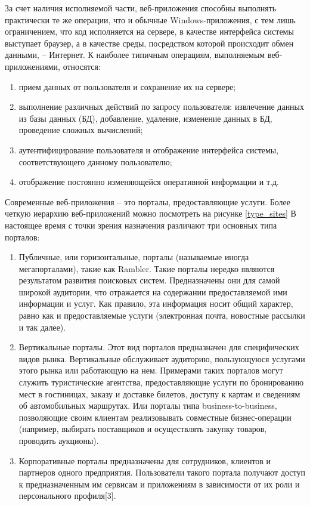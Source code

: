 За счет наличия исполняемой части, веб-приложения способны выполнять практически те же операции, что и обычные Windows-приложения, с тем лишь ограничением, что код исполняется на сервере, в качестве интерфейса системы выступает браузер, а в качестве среды, посредством которой происходит обмен данными, -- Интернет. К наиболее типичным операциям, выполняемым веб-приложениями, относятся:
\begin{enumerate}
\item прием данных от пользователя и сохранение их на сервере;
\item выполнение различных действий по запросу пользователя: извлечение данных из базы данных (БД), добавление, удаление, изменение данных в БД, проведение сложных вычислений;
\item аутентифицирование пользователя и отображение интерфейса системы, соответствующего данному пользователю;
\item отображение постоянно изменяющейся оперативной информации и т.д.
\end{enumerate}

Современные веб-приложения -- это порталы, предоставляющие услуги. Более четкую иерархию веб-приложений можно посмотреть на рисунке \ref{type_sites}
В настоящее время с точки зрения назначения различают три основных типа порталов:
\begin{enumerate}
\item Публичные, или горизонтальные, порталы (называемые иногда мегапорталами), такие как Rambler. Такие порталы нередко являются результатом развития поисковых систем. Предназначены они для самой широкой аудитории, что отражается на содержании предоставляемой ими информации и услуг. Как правило, эта информация носит общий характер, равно как и предоставляемые услуги (электронная почта, новостные рассылки и так далее).
\item  Вертикальные порталы. Этот вид порталов предназначен для специфических видов рынка. Вертикальные обслуживает аудиторию, пользующуюся услугами этого рынка или работающую на нем. Примерами таких порталов могут служить туристические агентства, предоставляющие услуги по бронированию мест в гостиницах, заказу и доставке билетов, доступу к картам и сведениям об автомобильных маршрутах. Или порталы типа business-to-business, позволяющие своим клиентам реализовывать совместные бизнес-операции (например, выбирать поставщиков и осуществлять закупку товаров, проводить аукционы).
\item Корпоративные порталы предназначены для сотрудников, клиентов и партнеров одного предприятия. Пользователи такого портала получают доступ к предназначенным им сервисам и приложениям в зависимости от их роли и персонального профиля[3].
\end{enumerate}

